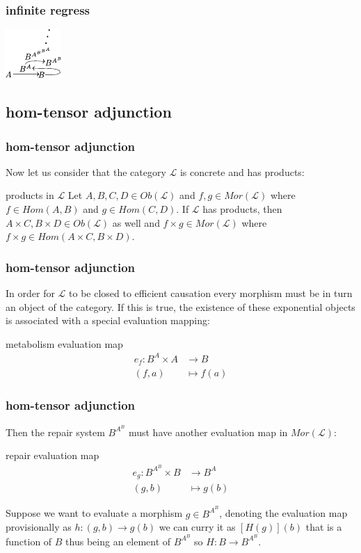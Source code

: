 \begin{frame}
\frametitle{infinite regress}
	\begin{center}
		\includegraphics[width=0.4\framewidth]{fig/mrcatinf.pdf}
	\end{center}
\end{frame}

\subsection{hom-tensor adjunction}
\begin{frame}
\frametitle{hom-tensor adjunction}
Now let us consider that the category $\mathcal{L}$ is concrete and has products:
\begin{block}{products in $\mathcal{L}$}
Let $A,B,C,D \in Ob(\mathcal{L})$ and $f,g \in Mor(\mathcal{L})$ where $f  \in Hom(A,B)$ and $g  \in Hom(C,D)$. If $\mathcal{L}$ has products, then $A \times C, B \times D \in Ob(\mathcal{L})$ as well and $f \times g \in Mor(\mathcal{L})$ where $f \times g \in Hom(A \times C ,B \times D)$.
\end{block}
\end{frame}

\begin{frame}
\frametitle{hom-tensor adjunction}
In order for  $\mathcal{L}$  to be closed to efficient causation every morphism must be in turn an object of the category. If this is true, the existence of these exponential objects is associated with a special evaluation mapping:
\begin{block}{metabolism evaluation map}
\abovedisplayskip=0pt
\begin{align*}
e_f : B^A \times A &\longrightarrow B\\
(f,a) & \longmapsto f(a)
\end{align*}
\end{block}
\end{frame}

\begin{frame}
\frametitle{hom-tensor adjunction}
Then the repair system $B^{A^B}$ must have another evaluation map in $Mor(\mathcal{L})$:
\begin{block}{repair evaluation map}
\abovedisplayskip=0pt
\begin{align*}
	e_g: B^{A^B} \times B &\longrightarrow B^A\\
	                (g,b) & \longmapsto    g(b)
\end{align*}
\end{block}
Suppose we want to evaluate a morphism $g \in B^{A^B}$, denoting the evaluation map provisionally as $h: (g,b)\rightarrow g(b) $ we can curry it as $[H(g)](b)$ that is a function of $B$ thus being an element of $B^{A^B}$ so $H: B \rightarrow B^{A^B} $.
\end{frame}

